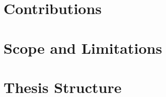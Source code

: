 \section{Contributions}
\label{sec:intro:contributions}

\section{Scope and Limitations}
\label{sec:intro:scope}

\section{Thesis Structure}
\label{sec:intro:structure}
